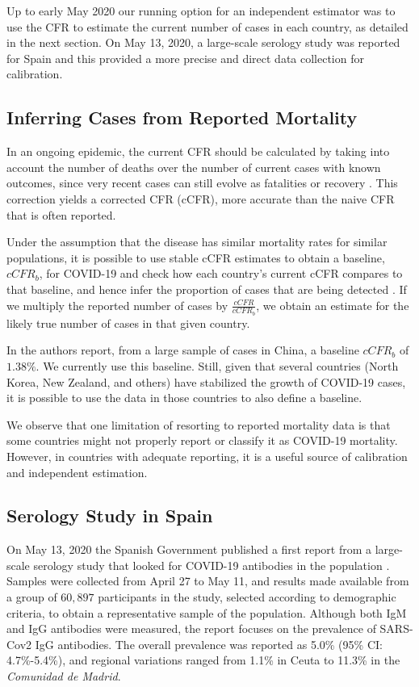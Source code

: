 \documentclass{article}
\begin{document}
Up to early May 2020 our running option for an independent estimator was to use the CFR to estimate the current number of cases in each country, as detailed in the next section. On May 13, 2020, a large-scale serology study was reported for Spain \cite{ENEcovid19} and this provided a more precise and direct data collection for calibration. 

\subsection{Inferring Cases from Reported Mortality}

In an ongoing epidemic, the current CFR should be calculated by taking into account the number of deaths over the number of current cases with known outcomes, since very recent cases can still evolve as fatalities or recovery \cite{nishiura2009early}. This correction yields a corrected CFR (cCFR), more accurate than the naive CFR that is often reported. 

Under the assumption that the disease has similar mortality rates for similar populations, it is possible to use stable cCFR estimates to obtain a baseline, $\textit{cCFR}_b$, for COVID-19 and check how each country's current cCFR compares to that baseline, and hence infer the proportion of cases that are being detected \cite{russel2020using}. If we multiply the reported number of cases by $\frac{\textit{cCFR}}{\textit{cCFR}_b}$, we obtain an estimate for the likely true number of cases in that given country. 

In \cite{Verity2020} the authors report, from a large sample of cases in China, a baseline $\textit{cCFR}_b$ of $1.38\%$. We currently use this baseline. Still, given that several countries (North Korea, New Zealand, and others) have stabilized the growth of COVID-19 cases, it is possible to use the data in those countries to also define a baseline.

We observe that one limitation of resorting to reported mortality data is that some countries might not properly report or classify it as COVID-19 mortality. However, in countries with adequate reporting, it is a useful source of calibration and independent estimation.


\subsection{Serology Study in Spain}

On May 13, 2020 the Spanish Government published a first report from a large-scale serology study that looked for COVID-19 antibodies in the population \cite{ENEcovid19}. Samples were collected from April 27 to May 11, and results made available from a group of $60,897$ participants in the study, selected according to demographic criteria, to obtain a representative sample of the population. Although both IgM and IgG antibodies were measured, the report focuses on the prevalence of  SARS-Cov2 IgG antibodies. The overall prevalence was reported as 5.0\% (95\% CI: 4.7\%-5.4\%), and regional variations ranged from 1.1\% in Ceuta to 11.3\% in the \emph{Comunidad de Madrid}.
\end{document}
